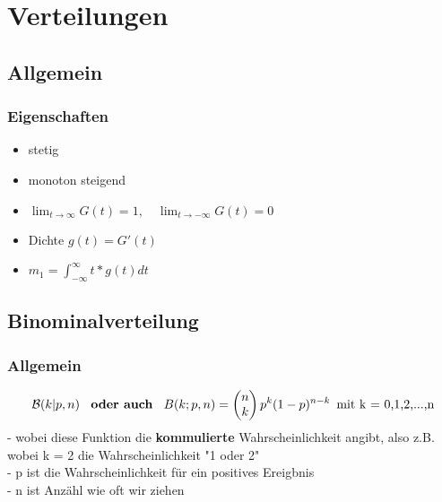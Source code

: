 \documentclass{article}
\begin{document}
	\section{Verteilungen}
	\subsection{Allgemein}
	\subsubsection{Eigenschaften}
	\begin{itemize}		
		\item stetig
		\item monoton steigend
		\item $\lim_{t \to \infty} G(t) = 1, \quad \lim_{t \to -\infty} G(t) = 0$
		\item Dichte $g(t) = G'(t)$
		\item $m_1 = \int_{-\infty}^{\infty}t*g(t)dt$
	\end{itemize}
	\subsection{Binominalverteilung}
	\subsubsection{Allgemein}
	\[
	\mathcal{B}(k | p,n) \enspace \textbf{ oder auch } \enspace B(k;p,n) =
	\begin{pmatrix} n \\ k \end{pmatrix} p^k(1-p)^{n-k} \enspace \newline
	\text{mit k = 0,1,2,...,n} \]
	- wobei diese Funktion die \textbf{kommulierte} Wahrscheinlichkeit angibt, also z.B.
	wobei k = 2 die Wahrscheinlichkeit "1 oder 2"
	\\ - p ist die Wahrscheinlichkeit für ein positives Ereigbnis
	\\ - n ist Anzähl wie oft wir ziehen
	
\end{document}
